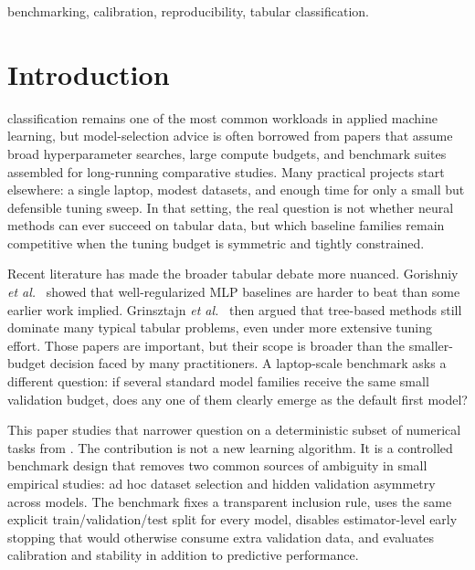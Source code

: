 \documentclass{ieeeaccess}
\begin{document}
\begin{keywords}
benchmarking, calibration, reproducibility, tabular classification.
\end{keywords}

\titlepgskip=-15pt
\maketitle

\section{Introduction}
 classification remains one of the most common workloads in applied machine learning, but model-selection advice is often borrowed from papers that assume broad hyperparameter searches, large compute budgets, and benchmark suites assembled for long-running comparative studies. Many practical projects start elsewhere: a single laptop, modest datasets, and enough time for only a small but defensible tuning sweep. In that setting, the real question is not whether neural methods can ever succeed on tabular data, but which baseline families remain competitive when the tuning budget is symmetric and tightly constrained.

Recent literature has made the broader tabular debate more nuanced. Gorishniy \emph{et al.}\ \cite{gorishniy2021} showed that well-regularized MLP baselines are harder to beat than some earlier work implied. Grinsztajn \emph{et al.}\ \cite{grinsztajn2022} then argued that tree-based methods still dominate many typical tabular problems, even under more extensive tuning effort. Those papers are important, but their scope is broader than the smaller-budget decision faced by many practitioners. A laptop-scale benchmark asks a different question: if several standard model families receive the same small validation budget, does any one of them clearly emerge as the default first model?

This paper studies that narrower question on a deterministic subset of numerical tasks from \BenchmarkSuiteName{}. The contribution is not a new learning algorithm. It is a controlled benchmark design that removes two common sources of ambiguity in small empirical studies: ad hoc dataset selection and hidden validation asymmetry across models. The benchmark fixes a transparent inclusion rule, uses the same explicit train/validation/test split for every model, disables estimator-level early stopping that would otherwise consume extra validation data, and evaluates calibration and stability in addition to predictive performance.
\end{document}
